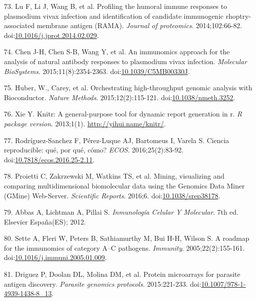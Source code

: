 \documentclass[]{article}
\begin{document}
\hypertarget{ref-lu2014rama}{}
73. Lu F, Li J, Wang B, et al. Profiling the humoral immune responses to
plasmodium vivax infection and identification of candidate immunogenic
rhoptry-associated membrane antigen (RAMA). \emph{Journal of
proteomics}. 2014;102:66-82.
doi:\href{https://doi.org/10.1016/j.jprot.2014.02.029}{10.1016/j.jprot.2014.02.029}.

\hypertarget{ref-chen2015immunomics}{}
74. Chen J-H, Chen S-B, Wang Y, et al. An immunomics approach for the
analysis of natural antibody responses to plasmodium vivax infection.
\emph{Molecular BioSystems}. 2015;11(8):2354-2363.
doi:\href{https://doi.org/10.1039/C5MB00330J}{10.1039/C5MB00330J}.

\hypertarget{ref-Biobase}{}
75. Huber, W., Carey, et al. Orchestrating high-throughput genomic
analysis with Bioconductor. \emph{Nature Methods}. 2015;12(2):115-121.
doi:\href{https://doi.org/10.1038/nmeth.3252}{10.1038/nmeth.3252}.

\hypertarget{ref-knitr}{}
76. Xie Y. Knitr: A general-purpose tool for dynamic report generation
in r. \emph{R package version}. 2013;1(1).
\url{http://yihui.name/knitr/}.

\hypertarget{ref-CienciaReproducible2016}{}
77. Rodríguez-Sanchez F, Pérez-Luque AJ, Bartomeus I, Varela S. Ciencia
reproducible: qué, por qué, cómo? \emph{ECOS}. 2016;25(2):83-92.
doi:\href{https://doi.org/10.7818/ecos.2016.25-2.11}{10.7818/ecos.2016.25-2.11}.

\hypertarget{ref-gmine2016}{}
78. Proietti C, Zakrzewski M, Watkins TS, et al. Mining, visualizing and
comparing multidimensional biomolecular data using the Genomics Data
Miner (GMine) Web-Server. \emph{Scientific Reports}. 2016;6.
doi:\href{https://doi.org/10.1038/srep38178}{10.1038/srep38178}.

\hypertarget{ref-abbas2012}{}
79. Abbas A, Lichtman A, Pillai S. \emph{Inmunología Celular Y
Molecular}. 7th ed. Elsevier España(ES); 2012.

\hypertarget{ref-sette2005}{}
80. Sette A, Fleri W, Peters B, Sathiamurthy M, Bui H-H, Wilson S. A
roadmap for the immunomics of category A--C pathogens. \emph{Immunity}.
2005;22(2):155-161.
doi:\href{https://doi.org/10.1016/j.immuni.2005.01.009}{10.1016/j.immuni.2005.01.009}.

\hypertarget{ref-Driguez2015}{}
81. Driguez P, Doolan DL, Molina DM, et al. Protein microarrays for
parasite antigen discovery. \emph{Parasite genomics protocols}.
2015:221-233.
doi:\href{https://doi.org/10.1007/978-1-4939-1438-8_13}{10.1007/978-1-4939-1438-8\_13}.
\end{document}
